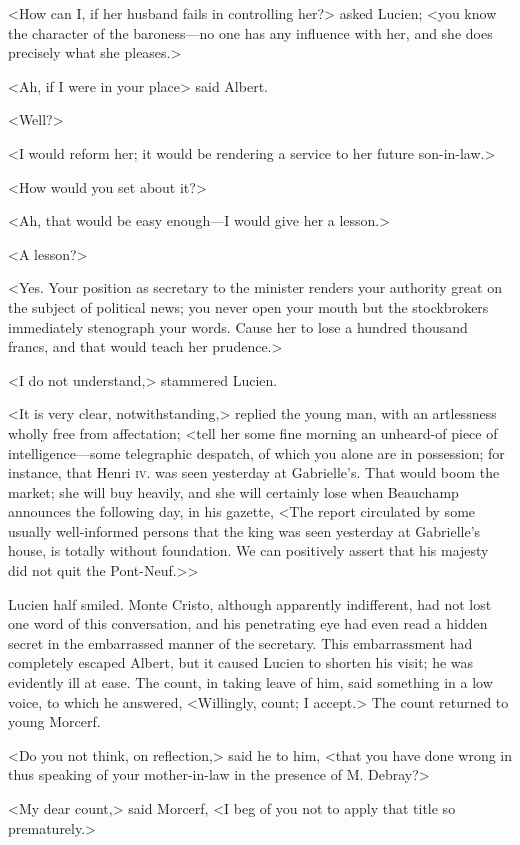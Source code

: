  <How can I, if her husband fails in controlling her?> asked Lucien; <you know the character of the baroness—no one has any influence with her, and she does precisely what she pleases.> 

 <Ah, if I were in your place\longdash> said Albert. 

 <Well?> 

 <I would reform her; it would be rendering a service to her future son-in-law.> 

 <How would you set about it?> 

 <Ah, that would be easy enough—I would give her a lesson.> 

 <A lesson?> 

 <Yes. Your position as secretary to the minister renders your authority great on the subject of political news; you never open your mouth but the stockbrokers immediately stenograph your words. Cause her to lose a hundred thousand francs, and that would teach her prudence.> 

 <I do not understand,> stammered Lucien. 

 <It is very clear, notwithstanding,> replied the young man, with an artlessness wholly free from affectation; <tell her some fine morning an unheard-of piece of intelligence—some telegraphic despatch, of which you alone are in possession; for instance, that Henri \textsc{iv.} was seen yesterday at Gabrielle's. That would boom the market; she will buy heavily, and she will certainly lose when Beauchamp announces the following day, in his gazette, <The report circulated by some usually well-informed persons that the king was seen yesterday at Gabrielle's house, is totally without foundation. We can positively assert that his majesty did not quit the Pont-Neuf.>> 

 Lucien half smiled. Monte Cristo, although apparently indifferent, had not lost one word of this conversation, and his penetrating eye had even read a hidden secret in the embarrassed manner of the secretary. This embarrassment had completely escaped Albert, but it caused Lucien to shorten his visit; he was evidently ill at ease. The count, in taking leave of him, said something in a low voice, to which he answered, <Willingly, count; I accept.> The count returned to young Morcerf. 

 <Do you not think, on reflection,> said he to him, <that you have done wrong in thus speaking of your mother-in-law in the presence of M. Debray?> 

 <My dear count,> said Morcerf, <I beg of you not to apply that title so prematurely.> 

